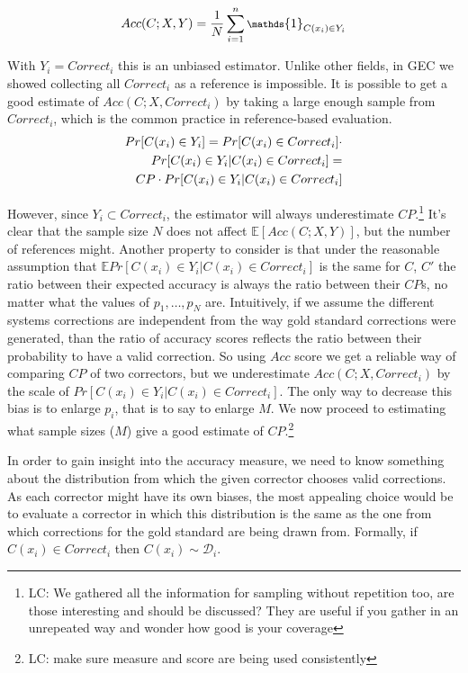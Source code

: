 \documentclass[letter,11pt]{article}
\newcommand{\lc}[1]{\footnote{\color{green}LC: #1}}
\begin{document}
\begin{equation}
  \footnotesize
  Acc(C;X,Y) = \frac{1}{N} \sum_{i=1}^n \mathds{1}_{C(x_i) \in Y_i}
\end{equation}

With $Y_i=Correct_i$ this is an unbiased estimator. Unlike other fields, in GEC we showed collecting all $Correct_i$ as a reference is impossible. It is possible to get a good estimate of $Acc(C;X,Correct_i)$
by taking a large enough sample from $Correct_i$, which is the common practice in reference-based evaluation.
\begin{align}\label{eq:correction-in-gs}
  \footnotesize
  Pr[C(x_i) \in Y_i] = Pr[C(x_i) \in Correct_i] \cdot \\
  Pr[C(x_i) \in Y_i | C(x_i) \in Correct_i] = \nonumber \\
  CP\cdot Pr[C(x_i) \in Y_i | C(x_i) \in Correct_i]\nonumber
\end{align}

 However, since $Y_i \subset Correct_i$, the estimator will always underestimate $CP$.\lc{We gathered all the information for sampling without repetition too, are those interesting and should be discussed? They are useful if you gather in an unrepeated way and wonder how good is your coverage }
It's clear that the sample size $N$ does not affect $\mathbb{E}[Acc(C;X,Y)]$, but the number of references
might. Another property to consider is that under the reasonable assumption that $\mathbb{E}Pr[C(x_i) \in Y_i | C(x_i) \in Correct_i]$ is the same for $C$, $C'$ the ratio between their expected accuracy
is always the ratio between their $CP$s, no matter what the values of $p_1,\ldots,p_N$ are. Intuitively, if we assume the different systems corrections are independent from the way gold standard corrections were generated, than the ratio of accuracy scores reflects the ratio between their probability to have a valid correction.
So using $Acc$ score we get a reliable way of comparing $CP$ of two correctors,
but we underestimate $Acc\left(C;X,Correct_i\right)$ by the scale of $Pr\left[C\left(x_i\right) \in Y_i | C\left(x_i\right) \in Correct_i\right]$. The only way to decrease this bias
is to enlarge $p_i$, that is to say to enlarge $M$. 
We now proceed to estimating what sample sizes ($M$) give a good estimate of $CP$.\lc{make sure measure and score are being used consistently}

In order to gain insight into the accuracy measure, we need to know something about the distribution from which the given corrector chooses valid corrections. As each corrector might have its own biases, the most appealing choice would be to evaluate a corrector in which this distribution is the same as the one from which corrections for the gold standard are being drawn from. Formally, if $C\left(x_i\right) \in Correct_i$ then $C\left(x_i\right) \sim \mathcal{D}_i$. 
\end{document}
